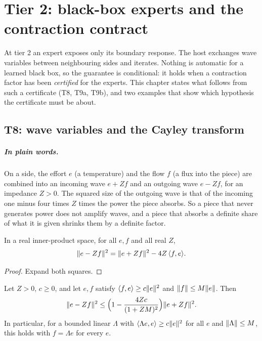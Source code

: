 \chapter{Tier 2: black-box experts and the contraction contract}

At tier 2 an expert exposes only its boundary response.  The host exchanges
wave variables between neighbouring sides and iterates.  Nothing is automatic
for a learned black box, so the guarantee is conditional: it holds when a
contraction factor has been \emph{certified} for the experts.  This chapter
states what follows from such a certificate (T8, T9a, T9b), and two examples
that show which hypothesis the certificate must be about.

\section{T8: wave variables and the Cayley transform}

\paragraph{In plain words.}
On a side, the effort $e$ (a temperature) and the flow $f$ (a flux into the
piece) are combined into an incoming wave $e+Zf$ and an outgoing wave $e-Zf$,
for an impedance $Z>0$.  The squared size of the outgoing wave is that of the
incoming one minus four times $Z$ times the power the piece absorbs.  So a
piece that never generates power does not amplify waves, and a piece that
absorbs a definite share of what it is given shrinks them by a definite factor.

\begin{lemma}\label{lem:T8-identity}
  \leanok
  In a real inner-product space, for all $e,f$ and all real $Z$,
  \[
    \lVert e-Zf\rVert^2=\lVert e+Zf\rVert^2-4Z\,\langle f,e\rangle .
  \]
\end{lemma}

\begin{proof}
  \leanok
  Expand both squares.
\end{proof}

\begin{theorem}\label{thm:T8}
  \leanok
  Let $Z>0$, $c\ge0$, and let $e,f$ satisfy
  $\langle f,e\rangle\ge c\lVert e\rVert^2$ and $\lVert f\rVert\le M\lVert e\rVert$.  Then
  \[
    \lVert e-Zf\rVert^2\le\Bigl(1-\frac{4Zc}{(1+ZM)^2}\Bigr)\lVert e+Zf\rVert^2 .
  \]
  In particular, for a bounded linear $\Lambda$ with
  $\langle\Lambda e,e\rangle\ge c\lVert e\rVert^2$ for all $e$ and
  $\lVert \Lambda\rVert\le M$, this holds with $f=\Lambda e$ for every $e$.
\end{theorem}

